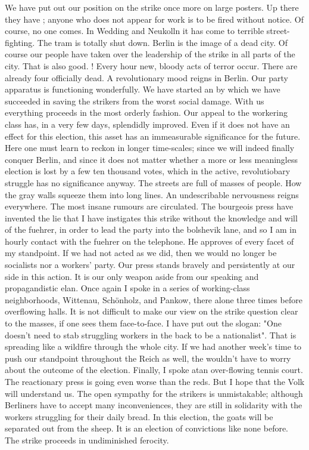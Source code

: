 
We have put out our position on the strike once more on large posters. Up there they have ;  anyone who does not appear for work is to be fired without notice. Of course, no one comes. In Wedding and Neukolln it has come to terrible street-fighting. The tram is totally shut down. Berlin is the image of a dead city. Of course our people have taken over the leadership of the strike in all parts of the city. That is also good. ! Every hour new, bloody acts of terror occur. There are already four officially dead. A revolutionary mood reigns in Berlin. Our party apparatus is functioning wonderfully. We have started an  by which we have succeeded in saving the strikers from the worst social damage. With us everything proceeds in the most orderly fashion. Our appeal to the workering class has, in a very few days, splendidly improved. Even if it does not have an effect for this election, this asset has an immeasurable significance for the future. Here one must learn to reckon in longer time-scales; since we will indeed finally conquer Berlin, and since it does not matter whether a more or less meaningless election is lost by a few ten thousand votes, which in the active, revolutiobary struggle has no significance anyway. The streets are full of masses of people. How the gray walls squeeze them into long lines. An undescribable nervousness reigns everywhere. The most insane rumours are circulated. The bourgeois press have invented the lie that I have instigates this strike without the knowledge and will of the fuehrer, in order to lead the party into the bolshevik lane, and so I am in hourly contact with the fuehrer on the telephone. He approves of every facet of my standpoint. If we had not acted as we did, then we would no longer be socialists nor a workers' party. Our press stands bravely and persistently at our side in this action. It is our only weapon aside from our speaking and propagandistic elan. Once again I spoke  in a series of working-class neighborhoods, Wittenau, Schönholz, and Pankow, there alone three times before overflowing halls. It is not difficult to make our view on the strike question clear to the masses, if one sees them face-to-face. I have put out the slogan: "One doesn't need to stab struggling workers in the back to be a nationalist". That is spreading like a wildfire through the whole city. If we had another week's time to push our standpoint throughout the Reich as well, the wouldn't have to worry about the outcome of the election. Finally, I spoke atan over-flowing tennis court. The reactionary press is going even worse than the reds. But I hope that the Volk will understand us. The open sympathy for the strikers is unmistakable; although Berliners have to accept many inconveniences, they are still in solidarity with the workers struggling for their daily bread. In this election, the goats will be separated out from the sheep. It is an election of convictions like none before. The strike proceeds in undiminished ferocity.

